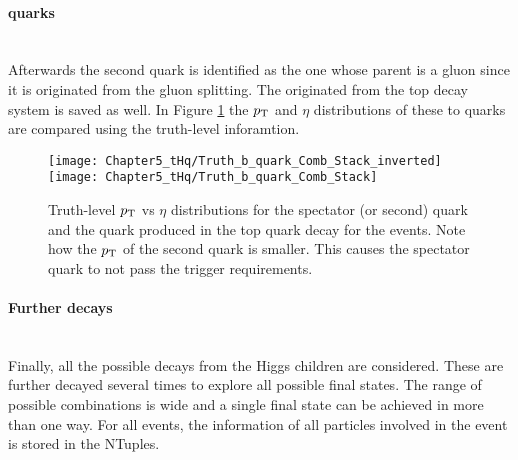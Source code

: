 \paragraph{\Pbottom quarks}\mbox{}\\
 Afterwards the second \Pbottom quark is identified as the one whose parent
 is a gluon since it is originated from the gluon splitting. The \Pbottom originated 
 from the top decay system is saved as well. In Figure \ref{fig:tHq:pTvsEta_bQuark}
 the $p_{\text{T}}$ and $\eta$ distributions of these to quarks are compared using the truth-level
 inforamtion.
 
\begin{figure}[htbp!]
\centering
\texttt{[image: Chapter5\_tHq/Truth\_b\_quark\_Comb\_Stack\_inverted]}
\texttt{[image: Chapter5\_tHq/Truth\_b\_quark\_Comb\_Stack]}

\caption{Truth-level $p_{\text{T}}$ vs $\eta$ distributions for the spectator (or second) \Pbottom quark and 
the \Pbottom quark produced in the top quark decay for the \tHq events. Note
how the $p_{\text{T}}$ of the second \Pbottom quark is smaller. This causes the spectator quark to not
pass the trigger requirements.}
\label{fig:tHq:pTvsEta_bQuark}
\end{figure}
 
\paragraph{Further decays}\mbox{}\\
Finally, all the possible decays from the Higgs children are considered.
These are further decayed several times to explore all possible final states.
The range of possible combinations is wide and a single final
state can be achieved in more than one way. 
For all \tHq events, the information of
all particles involved in the event is stored in the NTuples.

 
